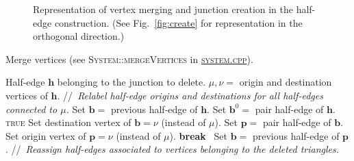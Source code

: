 \documentclass[aps, superscriptaddress, notitlepage]{revtex4-1}
\providecommand{\LINECOMMENT}[1]{\STATEx//~{\em#1}}
\def\scale{0.8}
\providecommand\BREAK{\STATE\textbf{break}~}
\providecommand\TRUE{\textsc{true}}
\begin{document}
\begin{figure}[!t]
\centering
\begin{tikzpicture}[scale=0.75*\scale]

\end{tikzpicture}
\caption{Representation of vertex merging and junction creation in the half-edge construction. (See Fig.~\ref{fig:create} for representation in the orthogonal direction.)}
\label{fig:merge}
\end{figure}

\begin{algorithm}[H]
\caption{Merge vertices (see \textsc{System::mergeVertices} in \href{../system.cpp}{\textsc{system.cpp}}).}
\label{alg:merge}
\begin{algorithmic}[1]
\REQUIRE Half-edge $\boldsymbol{h}$ belonging to the junction to delete. 
\STATE $\mu, \nu =$ origin and destination vertices of $\boldsymbol{h}$.
\LINECOMMENT{Relabel half-edge origins and destinations for all half-edges connected to $\mu$.}
\STATE Set $\boldsymbol{b} =$ previous half-edge of $\boldsymbol{h}$.
\STATE Set $\boldsymbol{b}^0 =$ pair half-edge of $\boldsymbol{h}$.
\WHILE\TRUE {}
    \STATE Set destination vertex of $\boldsymbol{b} = \nu$ (instead of $\mu$).
    \STATE Set $\boldsymbol{p} =$ pair half-edge of $\boldsymbol{b}$.
    \STATE Set origin vertex of $\boldsymbol{p} = \nu$ (instead of $\mu$).
     
        \BREAK
        \label{alg:merge_break}
    \ENDIF
    \STATE Set $\boldsymbol{b} =$ previous half-edge of $\boldsymbol{p}$.
\ENDWHILE
\LINECOMMENT{Reassign half-edges associated to vertices belonging to the deleted triangles.}
 
 
 

\end{algorithmic}
\end{algorithm}
\end{document}
